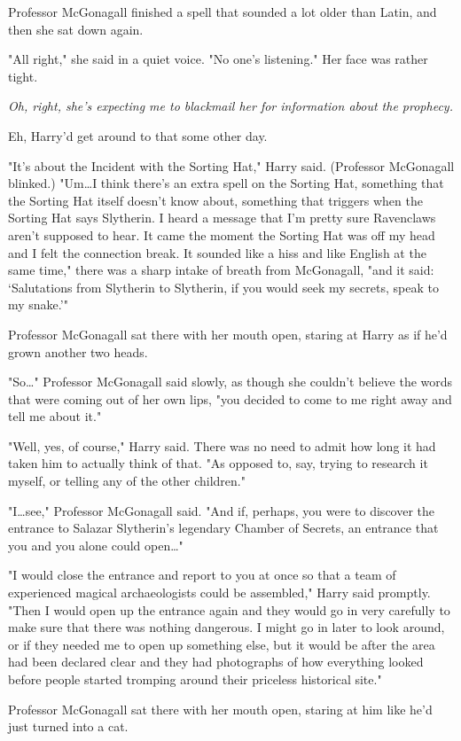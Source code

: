 Professor McGonagall finished a spell that sounded a lot older than Latin, and
then she sat down again.

"All right," she said in a quiet voice. "No one's listening." Her face was
rather tight.

\emph{Oh, right, she's expecting me to blackmail her for information about the
prophecy.}

Eh, Harry'd get around to that some other day.

"It's about the Incident with the Sorting Hat," Harry said. (Professor
McGonagall blinked.) "Um…I think there's an extra spell on the Sorting
Hat, something that the Sorting Hat itself doesn't know about, something that
triggers when the Sorting Hat says Slytherin. I heard a message that I'm pretty
sure Ravenclaws aren't supposed to hear. It came the moment the Sorting Hat was
off my head and I felt the connection break. It sounded like a hiss and like
English at the same time," there was a sharp intake of breath from McGonagall,
"and it said: `Salutations from Slytherin to Slytherin, if you would seek my
secrets, speak to my snake.'"

Professor McGonagall sat there with her mouth open, staring at Harry as if he'd
grown another two heads.

"So…" Professor McGonagall said slowly, as though she couldn't believe
the words that were coming out of her own lips, "you decided to come to me
right away and tell me about it."

"Well, yes, of course," Harry said. There was no need to admit how long it had
taken him to actually think of that. "As opposed to, say, trying to research it
myself, or telling any of the other children."

"I…see," Professor McGonagall said. "And if, perhaps, you were to
discover the entrance to Salazar Slytherin's legendary Chamber of Secrets, an
entrance that you and you alone could open…"

"I would close the entrance and report to you at once so that a team of
experienced magical archaeologists could be assembled," Harry said promptly.
"Then I would open up the entrance again and they would go in very carefully to
make sure that there was nothing dangerous. I might go in later to look around,
or if they needed me to open up something else, but it would be after the area
had been declared clear and they had photographs of how everything looked
before people started tromping around their priceless historical site."

Professor McGonagall sat there with her mouth open, staring at him like he'd
just turned into a cat.

